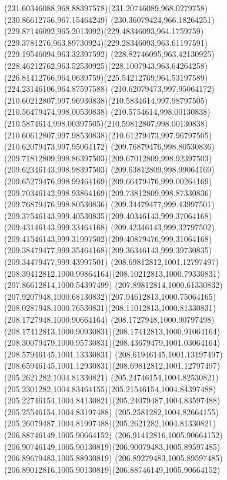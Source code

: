 {    \curveto(231.60346088,968.88397578)(231.20746089,968.0279758)(230.86612756,967.15464249)
    \curveto(230.36079424,966.18264251)(229.87146092,965.2013092)(229.48346093,964.1759759)
    \curveto(229.3781276,963.89730924)(229.28346093,963.61197591)(229.19546094,963.32397592)
    \curveto(228.82746095,963.42130925)(228.46212762,963.52530925)(228.1007943,963.64264258)
    \curveto(226.81412766,964.0639759)(225.54212769,964.53197589)(224.23146106,964.87597588)
    \moveto(210.62079473,997.95064172)
    \curveto(210.60212807,997.96930838)(210.5834614,997.98797505)(210.56479474,998.00530838)
    \curveto(210.5754614,998.00130838)(210.5874614,998.00397505)(210.59812807,998.00130838)
    \curveto(210.60612807,997.98530838)(210.61279473,997.96797505)(210.62079473,997.95064172)
    \moveto(209.76879476,998.80530836)
    \curveto(209.71812809,998.86397503)(209.67012809,998.92397503)(209.62346143,998.98397503)
    \curveto(209.63812809,998.99064169)(209.65279476,998.99464169)(209.66479476,999.00264169)
    \curveto(209.70346142,998.93864169)(209.73812809,998.87330836)(209.76879476,998.80530836)
    \moveto(209.34479477,999.43997501)
    \curveto(209.37546143,999.40530835)(209.40346143,999.37064168)(209.43146143,999.33464168)
    \curveto(209.42346143,999.32797502)(209.41546143,999.31997502)(209.40879476,999.31064168)
    \curveto(209.38479477,999.35464168)(209.36346143,999.39730835)(209.34479477,999.43997501)
    \moveto(208.69812812,1001.12797497)
    \curveto(208.39412812,1000.99864164)(208.10212813,1000.79330831)(207.86612814,1000.54397499)
    \curveto(207.89812814,1000.61330832)(207.9207948,1000.68130832)(207.94612813,1000.75064165)
    \curveto(208.0287948,1000.76530831)(208.11012813,1000.81330831)(208.1727948,1000.90664164)
    \curveto(208.1727948,1000.90797498)(208.17412813,1000.90930831)(208.17412813,1000.91064164)
    \curveto(208.30079479,1000.95730831)(208.43679479,1001.03064164)(208.57946145,1001.13330831)
    \curveto(208.61946145,1001.13197497)(208.65946145,1001.12930831)(208.69812812,1001.12797497)
    \moveto(205.2621282,1004.81330821)
    \curveto(205.24746154,1004.82530821)(205.2301282,1004.83464155)(205.21546154,1004.84397488)
    \curveto(205.22746154,1004.84130821)(205.24079487,1004.83597488)(205.25546154,1004.83197488)
    \curveto(205.2581282,1004.82664155)(205.26079487,1004.81997488)(205.2621282,1004.81330821)
    \moveto(206.88746149,1005.90664152)
    \lineto(206.91412816,1005.90664152)
    \curveto(206.90746149,1005.90130819)(206.90079483,1005.89597485)(206.89679483,1005.88930819)
    \curveto(206.89279483,1005.89597485)(206.89012816,1005.90130819)(206.88746149,1005.90664152)
}
